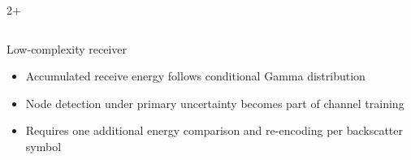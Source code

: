 \documentclass[final,xcolor={table}]{beamer}
\newlength{\sepwidth}
\newlength{\colwidth}
\begin{document}
\begin{frame}[t]
\begin{columns}[t]
\begin{column}{2\colwidth+\sepwidth}
			\vspace{-1.3cm}
			\begin{columns}[t,totalwidth=\textwidth]
				\begin{column}{\colwidth}
					\begin{block}{Low-complexity receiver}
						\begin{figure}[!t]
							\centering
							\subfloat{
								\resizebox{0.42\linewidth}{!}{
									
								}
							}
							\hspace{-1.5cm}
							\subfloat{
								\resizebox{0.58\linewidth}{!}{
									
								}
							}
							\label{fg:receiver}
						\end{figure}
						\vspace{0.5cm}
						\begin{itemize}\setlength\itemsep{20pt}
							\item Accumulated receive energy follows conditional Gamma distribution
							\item Node detection under primary uncertainty becomes part of channel training
							\item Requires one additional energy comparison and re-encoding per backscatter symbol
						\end{itemize}
					\end{block}


\end{column}
\end{columns}
\end{column}
\end{columns}
\end{frame}
\end{document}
